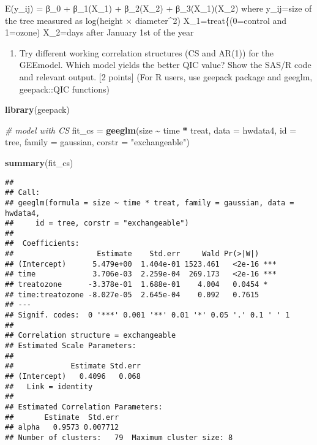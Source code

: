 \documentclass[
]{article}
\newenvironment{Shaded}{\begin{snugshade}}{\end{snugshade}}
\newcommand{\AttributeTok}[1]{\textcolor[rgb]{0.13,0.29,0.53}{#1}}
\newcommand{\CommentTok}[1]{\textcolor[rgb]{0.56,0.35,0.01}{\textit{#1}}}
\newcommand{\FunctionTok}[1]{\textcolor[rgb]{0.13,0.29,0.53}{\textbf{#1}}}
\newcommand{\NormalTok}[1]{#1}
\newcommand{\OtherTok}[1]{\textcolor[rgb]{0.56,0.35,0.01}{#1}}
\newcommand{\SpecialCharTok}[1]{\textcolor[rgb]{0.81,0.36,0.00}{\textbf{#1}}}
\newcommand{\StringTok}[1]{\textcolor[rgb]{0.31,0.60,0.02}{#1}}
\providecommand{\tightlist}{%
  \setlength{\itemsep}{0pt}\setlength{\parskip}{0pt}}
\begin{document}
E(y\_ij) = β\_0 + β\_1(X\_1) + β\_2(X\_2) + β\_3(X\_1)(X\_2) where
y\_ij=size of the tree measured as log(height × diameter\^{}2)
X\_1=treat\{(0=control and 1=ozone) X\_2=days after January 1st of the
year

\begin{enumerate}
\def\labelenumi{\arabic{enumi}.}
\setcounter{enumi}{1}
\tightlist
\item
  Try different working correlation structures (CS and AR(1)) for the
  GEEmodel. Which model yields the better QIC value? Show the SAS/R code
  and relevant output. {[}2 points{]} (For R users, use geepack package
  and geeglm, geepack::QIC functions)
\end{enumerate}

\begin{Shaded}
\begin{Highlighting}[]
\FunctionTok{library}\NormalTok{(geepack)}

\CommentTok{\# model with CS}
\NormalTok{fit\_cs }\OtherTok{=}
  \FunctionTok{geeglm}\NormalTok{(size }\SpecialCharTok{\textasciitilde{}}\NormalTok{ time }\SpecialCharTok{*}\NormalTok{ treat, }
         \AttributeTok{data =}\NormalTok{ hwdata4, }
         \AttributeTok{id =}\NormalTok{ tree,}
         \AttributeTok{family =}\NormalTok{ gaussian, }
         \AttributeTok{corstr =} \StringTok{"exchangeable"}\NormalTok{)}

\FunctionTok{summary}\NormalTok{(fit\_cs)}
\end{Highlighting}
\end{Shaded}

\begin{verbatim}
## 
## Call:
## geeglm(formula = size ~ time * treat, family = gaussian, data = hwdata4, 
##     id = tree, corstr = "exchangeable")
## 
##  Coefficients:
##                   Estimate    Std.err     Wald Pr(>|W|)    
## (Intercept)      5.479e+00  1.404e-01 1523.461   <2e-16 ***
## time             3.706e-03  2.259e-04  269.173   <2e-16 ***
## treatozone      -3.378e-01  1.688e-01    4.004   0.0454 *  
## time:treatozone -8.027e-05  2.645e-04    0.092   0.7615    
## ---
## Signif. codes:  0 '***' 0.001 '**' 0.01 '*' 0.05 '.' 0.1 ' ' 1
## 
## Correlation structure = exchangeable 
## Estimated Scale Parameters:
## 
##             Estimate Std.err
## (Intercept)   0.4096   0.068
##   Link = identity 
## 
## Estimated Correlation Parameters:
##       Estimate  Std.err
## alpha   0.9573 0.007712
## Number of clusters:   79  Maximum cluster size: 8
\end{verbatim}
\end{document}
